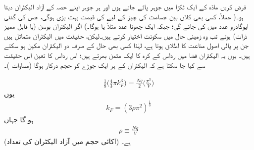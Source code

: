 فرض کریں مادّہ کے ایک ٹکڑا میں  جوہر پائے جاتے ہوں اور ہر جوہر اپنے حصہ کے  آزاد الیکٹران دیتا ہو۔( عملاً، کسی بھی کلاں بین جسامت کی چیز کے لیے  کی قیمت بہت بڑی ہوگی، جس کی گنتی ایوگادرو عدد میں کی جائے گی؛ جبکہ  ایک چھوٹا عدد مثلاً  یا  ہوگا۔) اگر الیکٹران بوسن (یا قابل ممیز ذرات) ہوتے تب وہ زمینی حال  میں سکونت اختیار کرتے ہیں۔لیکن، حقیقت میں الیکٹران متماثل  ہیں جن پر پالی اصول مناعت کا اطلاق ہوتا ہے، لہٰذا کسی بھی حال کے صرف دو الیکٹران مکین ہو سکتے ہیں۔ یوں یہ الیکٹران  فضا میں رداس  کے کرہ کا ایک مثمن  بھرتے ہیں؛ اس رداس کا تعین اس حقیقت سے کیا جا سکتا ہے کہ الیکٹران کے ہر ایک جوڑے کو  حجم درکار ہوگا (مساوات )۔

	\begin{align*}
		\frac{1}{8}\big(\frac{4}{3} \pi k^{3}_F\big ) = \frac{Nq}{2}\big (\frac{\pi^3}{V}\big )
	\end{align*}
یوں
\begin{align}\label{مساوات_متماثل_مستطیل_الف}
	k_F =(3\rho\pi^{2})^{\frac{1}{3}}
\end{align}
ہو گا جہاں
\begin{align}\label{مساوات_متماثل_مستطیل_ب}
	\rho \equiv \frac{Nq}{V}
\end{align}
 (اکائی حجم میں آزاد الیکٹران کی تعداد) ہے۔

